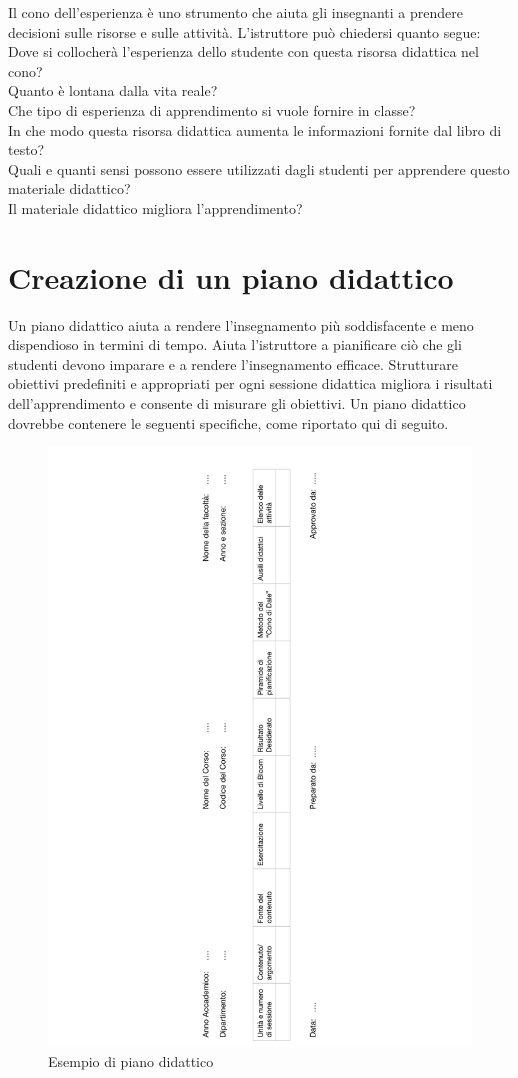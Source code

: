 Il cono dell'esperienza è uno strumento che aiuta gli insegnanti a prendere decisioni sulle risorse e sulle attività. L'istruttore può chiedersi quanto segue: Dove si collocherà l'esperienza dello studente con questa risorsa didattica nel cono?\\
Quanto è lontana dalla vita reale?\\
Che tipo di esperienza di apprendimento si vuole fornire in classe?\\
In che modo questa risorsa didattica aumenta le informazioni fornite dal libro di testo?\\
Quali e quanti sensi possono essere utilizzati dagli studenti per apprendere questo materiale didattico?\\
Il materiale didattico migliora l'apprendimento?\\
\section{Creazione di un piano didattico}
\label{sec:problem}
Un piano didattico aiuta a rendere l'insegnamento più soddisfacente e meno dispendioso in termini di tempo. Aiuta l'istruttore a pianificare ciò che gli studenti devono imparare e a rendere l'insegnamento efficace. Strutturare obiettivi predefiniti e appropriati per ogni sessione didattica migliora i risultati dell'apprendimento e consente di misurare gli obiettivi. Un piano didattico dovrebbe contenere le seguenti specifiche, come riportato qui di seguito.
\begin{figure}[h!]
  \centerline{\includegraphics[height = 17 cm, width= 5 cm, angle=270, trim= 7cm 0 7cm 0]{figures/piano.pdf}}
  \caption{Esempio di piano didattico}
\end{figure}

